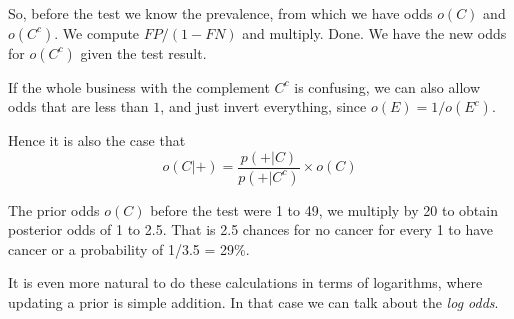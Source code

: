 \documentclass[11pt, oneside]{article}
\begin{document}
So, before the test we know the prevalence, from which we have odds $o(C)$ and $o(C^c)$.  We compute $FP/(1-FN)$ and multiply.  Done.  We have the new odds for $o(C^c)$ given the test result.

If the whole business with the complement $C^c$ is confusing, we can also allow odds that are less than $1$, and just invert everything, since $o(E) = 1/o(E^c)$.  

Hence it is also the case that
\[ o(C|+) = \frac{p(+|C)}{p(+|C^c)} \times o(C) \]

The prior odds $o(C)$ before the test were 1 to 49, we multiply by 20 to obtain posterior odds of 1 to 2.5.  That is 2.5 chances for no cancer for every 1 to have cancer or a probability of 1/3.5 = 29\%.

It is even more natural to do these calculations in terms of logarithms, where updating a prior is simple addition.  In that case we can talk about the \emph{log odds}.
\end{document}
